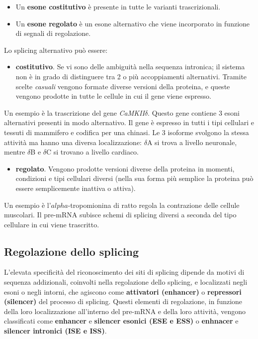 \documentclass[11pt]{book}
\begin{document}
\begin{itemize}
\item
  Un \textbf{esone costitutivo} è presente in tutte le varianti
  trascrizionali.
\item
  Un \textbf{esone regolato} è un esone alternativo che viene
  incorporato in funzione di segnali di regolazione.
\end{itemize}

Lo splicing alternativo può essere:

\begin{itemize}
\itemsep1pt\parskip0pt
\item
  \textbf{costitutivo}. Se vi sono delle ambiguità nella sequenza
  intronica; il sistema non è in grado di distinguere tra 2 o più
  accoppiamenti alternativi. Tramite scelte \emph{casuali} vengono
  formate diverse versioni della proteina, e queste vengono prodotte in
  tutte le cellule in cui il gene viene espresso.
\end{itemize}

Un esempio è la trascrizione del gene \emph{CaMKII\(\delta\)}. Questo
gene contiene 3 esoni alternativi presenti in modo alternativo. Il gene
è espresso in tutti i tipi cellulari e tessuti di mammifero e codifica
per una chinasi. Le 3 isoforme svolgono la stessa attività ma hanno una
diversa localizzazione: \(\delta\)A si trova a livello neuronale, mentre
\(\delta\)B e \(\delta\)C si trovano a livello cardiaco.

\begin{itemize}
\itemsep1pt\parskip0pt
\item
  \textbf{regolato}. Vengono prodotte versioni diverse della proteina in
  momenti, condizioni e tipi cellulari diversi (nella sua forma più
  semplice la proteina può essere semplicemente inattiva o attiva).
\end{itemize}

Un esempio è l'\(alpha\)-tropomionina di ratto regola la contrazione
delle cellule muscolari. Il pre-mRNA subisce schemi di splicing diversi
a seconda del tipo cellulare in cui viene trascritto.

\subsection{Regolazione dello
splicing}\label{regolazione-dello-splicing}

L'elevata specificità del riconoscimento dei siti di splicing dipende da
motivi di sequenza addizionali, coinvolti nella regolazione dello
splicing, e localizzati negli esoni o negli intorni, che agiscono come
\textbf{attivatori (enhancer)} o \textbf{repressori (silencer)} del
processo di splicing. Questi elementi di regolazione, in funzione della
loro localizzazione all'interno del pre-mRNA e della loro attività,
vengono classificati come \textbf{enhancer} e \textbf{silencer esonici
(ESE e ESS)} o \textbf{enhnacer} e \textbf{silencer intronici (ISE e
ISS)}.
\end{document}
